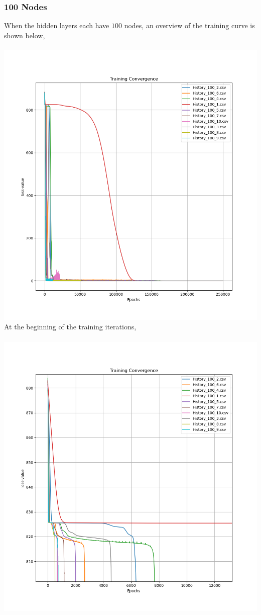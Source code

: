 \documentclass[a4paper, 12pt]{report}
\def\size{0.75}
\begin{document}
\begin{center}
\subsubsection{100 Nodes}
When the hidden layers each have $100$ nodes, an overview of the training curve is shown below,
\\~\\\includegraphics[scale=\size]{Width_100_Overview.png}
\newpage
At the beginning of the training iterations,
\\~\\\includegraphics[scale=\size]{Width_100_Beginning.png}

\end{center}
\end{document}
